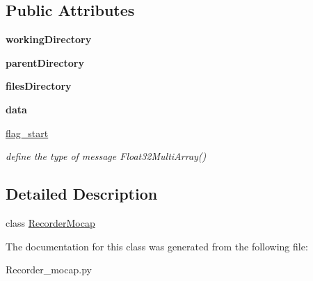 \subsection*{Public Attributes}
\begin{DoxyCompactItemize}
\item 
{\bfseries working\+Directory}\hypertarget{classRecorder__mocap_1_1RecorderMocap_ad6001fd638bf7e2f6c0340240935883d}{}\label{classRecorder__mocap_1_1RecorderMocap_ad6001fd638bf7e2f6c0340240935883d}

\item 
{\bfseries parent\+Directory}\hypertarget{classRecorder__mocap_1_1RecorderMocap_a63b53ac7be1510948932f3cfdb6a083d}{}\label{classRecorder__mocap_1_1RecorderMocap_a63b53ac7be1510948932f3cfdb6a083d}

\item 
{\bfseries files\+Directory}\hypertarget{classRecorder__mocap_1_1RecorderMocap_aa2e5b4cb986748ed995843370795a089}{}\label{classRecorder__mocap_1_1RecorderMocap_aa2e5b4cb986748ed995843370795a089}

\item 
{\bfseries data}\hypertarget{classRecorder__mocap_1_1RecorderMocap_a57fc29abab5aa54617d975cfffd93368}{}\label{classRecorder__mocap_1_1RecorderMocap_a57fc29abab5aa54617d975cfffd93368}

\item 
\hyperlink{classRecorder__mocap_1_1RecorderMocap_acda19dab01791450a15aa1b4138adf2c}{flag\+\_\+start}\hypertarget{classRecorder__mocap_1_1RecorderMocap_acda19dab01791450a15aa1b4138adf2c}{}\label{classRecorder__mocap_1_1RecorderMocap_acda19dab01791450a15aa1b4138adf2c}

\begin{DoxyCompactList}\small\item\em define the type of message Float32\+Multi\+Array() \end{DoxyCompactList}\end{DoxyCompactItemize}


\subsection{Detailed Description}
class \hyperlink{classRecorder__mocap_1_1RecorderMocap}{Recorder\+Mocap} 

The documentation for this class was generated from the following file\+:\begin{DoxyCompactItemize}
\item 
Recorder\+\_\+mocap.\+py\end{DoxyCompactItemize}
